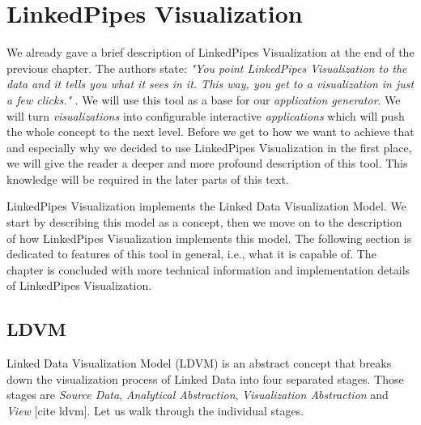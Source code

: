 \chapter{LinkedPipes Visualization}

We already gave a brief description of LinkedPipes Visualization \cite{linked_pipes_visualization} at the end of the previous chapter. The authors state: \emph{"You point LinkedPipes Visualization to the data and it tells you what it sees in it. This way, you get to a visualization in just a few clicks."}  \cite{linked_pipes_visualization}. We will use this tool as a base for our \emph{application generator}. We will turn \emph{visualizations} into configurable interactive \emph{applications} which will push the whole concept to the next level. Before we get to how we want to achieve that and especially why we decided to use LinkedPipes Visualization in the first place, we will give the reader a deeper and more profound description of this tool. This knowledge will be required in the later parts of this text.

LinkedPipes Visualization implements the Linked Data Visualization Model. We start by describing this model as a concept, then we move on to the description of how LinkedPipes Visualization implements this model. The following section is dedicated to features of this tool in general, i.e., what it is capable of. The chapter is concluded with more technical information and implementation details of LinkedPipes Visualization.

\section{LDVM}

Linked Data Visualization Model (LDVM) \cite{ldvm} is an abstract concept that breaks down the visualization process of Linked Data into four separated stages. Those stages are \emph{Source Data}, \emph{Analytical Abstraction}, \emph{Visualization Abstraction} and \emph{View} [cite ldvm]. Let us walk through the individual stages.

